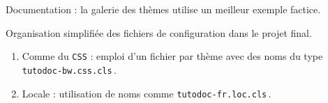 \documentclass{tutodoc}
\begin{document}
\begin{tdocupdate}
	\item Documentation : la galerie des thèmes utilise un meilleur exemple factice.
\end{tdocupdate}



\begin{tdoctech}
	\item Organisation simplifiée des fichiers de configuration dans le projet final.
	\begin{enumerate}
		\item Comme du \texttt{CSS} : emploi d'un fichier par thème avec des noms du type \texttt{tutodoc-bw.css.cls}\,.


		\item Locale : utilisation de noms comme \texttt{tutodoc-fr.loc.cls}\,.
	\end{enumerate}
\end{tdoctech}
\end{document}
